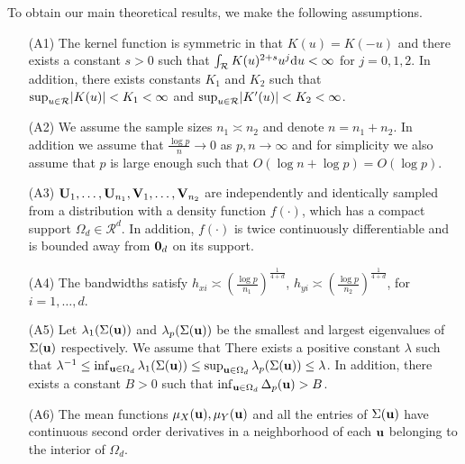 \documentclass[11pt]{article}
\theoremstyle{definition}
\begin{document}
 To obtain our main theoretical results, we make the following assumptions.
 \begin{itemize}
 	\item[(A1)] The kernel function is symmetric in that $K(u)=K(-u)$ and there exists a constant $s>0$ such that $\int_{\mathcal R}
 	K(u)^{2+s}u^j{\rm d}u<\infty$ for $j=0,1,2$. In addition, there exists
 	constants $K_1$ and $K_2$ such that ${\rm sup}_{u\in\mathcal R}|K(u)|<K_1<\infty$
 	and ${\rm sup}_{u\in\mathcal R}|K'(u)|<K_2<\infty$.
 	
 	\item[(A2)] We assume the sample sizes $n_1\asymp n_2$ and denote $n=n_1+n_2$. In addition we assume that ${\frac{\log p}{n}}\rightarrow 0$ as $p, n \rightarrow \infty$ and for simplicity we also assume that $p$ is large enough such that $O(\log n +\log p) = O(\log p)$.  
 	
 	
 	
 	\item[(A3)]   $ {\bf U}_1,\ldots , {\bf U}_{n_1}, {\bf V}_1,\ldots, {\bf V}_{n_2}$ are independently and identically sampled from a distribution with a density function $f(\cdot)$, which has a compact support $\Omega_d\in {\mathcal R}^d$. In addition, $f(\cdot)$ is twice continuously differentiable and is bounded away from ${\bf 0}_d$ on its support.
 	
 	\item[(A4)]  The bandwidths satisfy $h_{xi}\asymp \left(\frac{\log p}{n_1}\right)^{\frac{1}{4+d}}$, $h_{yi}\asymp \left(\frac{\log p}{n_2}\right)^{\frac{1}{4+d}}$, for $i=1,\ldots, d.$
 	
 	\item[(A5)] Let $\lambda_1(\Sigma({\bf u}))$ and $\lambda_p(\Sigma({\bf u}))$ be the smallest and largest eigenvalues of $\Sigma({\bf u})$ respectively. We assume that 
 	There exists a positive constant $\lambda$ such that 
 	$\lambda^{-1} \leq \inf_{{\bf u}\in \Omega_d}\lambda_1(\Sigma({\bf u})) \leq \sup_{{\bf u}\in \Omega_d}\lambda_p(\Sigma({\bf u}))\leq \lambda$. In addition, there exists a constant $B>0$ such that $\inf_{{\bf u}\in \Omega_d}\Delta_p({\bf u}) > B$.
 	
 	
 	
 	\item[(A6)] The mean functions $\mu_X({\bf u}), \mu_Y({\bf u})$ and all the entries of $\Sigma({\bf u})$ have continuous second order derivatives in a neighborhood of each ${\bf u}$ belonging to the interior of $\Omega_d$.
 	

\end{itemize}
\end{document}
